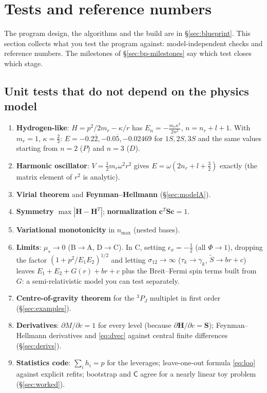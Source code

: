 \documentclass[11pt,a4paper]{article}
\numberwithin{equation}{section}
\theoremstyle{definition}
\theoremstyle{plain}
\theoremstyle{remark}
\numberwithin{algorithm}{section}
\newcommand{\mr}{m_r}
\newcommand{\mus}{\mu_s}
\newcommand{\mH}{\mathbf H}
\newcommand{\mS}{\mathbf S}
\newcommand{\vc}{\bm c}
\newcommand{\sC}{\mathsf C}
\begin{document}
\section{Tests and reference numbers}\label{sec:impl}
The program design, the algorithms and the build are in \S\ref{sec:blueprint}. This section collects what you test the program against: model-independent checks and reference numbers. The milestones of \S\ref{sec:bp-milestones} say which test closes which stage.

\subsection{Unit tests that do not depend on the physics model}
\begin{enumerate}[leftmargin=1.5em,itemsep=2pt]
\item \textbf{Hydrogen-like}: $H=p^2/2\mr-\kappa/r$ has $E_n=-\frac{\mr\kappa^2}{2n^2}$, $n=n_r+l+1$. With $\mr=1$, $\kappa=\frac23$: $E=-0.2\overline{2},-0.0\overline{5},-0.02469$ for $1S,2S,3S$ and the same values starting from $n=2$ ($P$) and $n=3$ ($D$).
\item \textbf{Harmonic oscillator}: $V=\frac12\mr\omega^2r^2$ gives $E=\omega(2n_r+l+\frac32)$ exactly (the matrix element of $r^2$ is analytic).
\item \textbf{Virial theorem} and \textbf{Feynman--Hellmann} (\S\ref{sec:modelA}).
\item \textbf{Symmetry} $\max|\mH-\mH^T|$; \textbf{normalization} $\vc^T\mS\vc=1$.
\item \textbf{Variational monotonicity} in $n_{\max}$ (nested bases).
\item \textbf{Limits}: $\mus\to0$ (B$\to$A, D$\to$C). In C, setting $\epsilon_x=-\frac12$ (all $\Phi\to1$), dropping the factor $(1+p^2/E_1E_2)^{1/2}$ and letting $\sigma_{12}\to\infty$ ($\tau_k\to\gamma_k$, $\tilde S\to br+c$) leaves $E_1+E_2+G(r)+br+c$ plus the Breit--Fermi spin terms built from $G$: a semi-relativistic model you can test separately.
\item \textbf{Centre-of-gravity theorem} for the ${}^3P_J$ multiplet in first order (\S\ref{sec:examples}).
\item \textbf{Derivatives}: $\partial M/\partial c=1$ for every level (because $\partial\mH/\partial c=\mS$); Feynman--Hellmann derivatives and \eqref{eq:dvec} against central finite differences (\S\ref{sec:derivs}).
\item \textbf{Statistics code}: $\sum_ih_i=p$ for the leverages; leave-one-out formula \eqref{eq:loo} against explicit refits; bootstrap and $\sC$ agree for a nearly linear toy problem (\S\ref{sec:worked}).
\end{enumerate}
\end{document}
